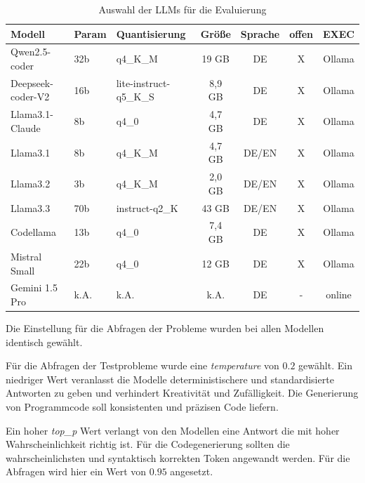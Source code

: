\begin{table}[!ht]
	\begin{tabular}{|l|l|l|c|c|c|c|}
		\hline
		\textbf{Modell} & \textbf{Param} & \textbf{Quantisierung} & \textbf{Größe} & \textbf{Sprache} & \textbf{offen} & \textbf{EXEC} \\
		\hline
		Qwen2.5-coder     & 32b &               q4\_K\_M &  19 GB &    DE & X & Ollama \\
		Deepseek-coder-V2 & 16b & lite-instruct-q5\_K\_S & 8,9 GB &    DE & X & Ollama \\
		Llama3.1-Claude   &  8b &                  q4\_0 & 4,7 GB &    DE & X & Ollama \\
		Llama3.1          &  8b &               q4\_K\_M & 4,7 GB & DE/EN & X & Ollama \\
		Llama3.2          &  3b &               q4\_K\_M & 2,0 GB & DE/EN & X & Ollama \\
		Llama3.3          & 70b &         instruct-q2\_K &  43 GB & DE/EN & X & Ollama \\
		Codellama         & 13b &                  q4\_0 & 7,4 GB &    DE & X & Ollama \\
		Mistral Small     & 22b &                  q4\_0 &  12 GB &    DE & X & Ollama \\
		Gemini 1.5 Pro    &k.A. &                   k.A. &   k.A. &    DE & - & online \\
		\hline
		\hline
	\end{tabular}
	\caption{Auswahl der LLMs für die Evaluierung}
	\label{tab:selected_llms}
\end{table}

Die Einstellung für die Abfragen der Probleme wurden bei allen Modellen identisch gewählt.\vspace{0.2cm}

Für die Abfragen der Testprobleme wurde eine \textit{temperature} von $0.2$ gewählt. Ein niedriger Wert veranlasst die Modelle deterministischere und standardisierte Antworten zu geben und verhindert Kreativität und Zufälligkeit. Die Generierung von Programmcode soll konsistenten und präzisen Code liefern.\vspace{0.2cm}

Ein hoher \textit{top\_p} Wert verlangt von den Modellen eine Antwort die mit hoher Wahrscheinlichkeit richtig ist. Für die Codegenerierung sollten die wahrscheinlichsten und syntaktisch korrekten Token angewandt werden. Für die Abfragen wird hier ein Wert von $0.95$ angesetzt.\vspace{0.2cm}

